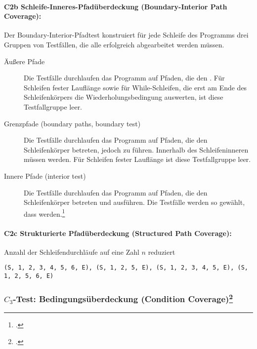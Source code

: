 \documentclass{lehramt-informatik-haupt}
\begin{document}
%

\paragraph{C2b Schleife-Inneres-Pfadüberdeckung (Boundary-Interior Path Coverage):}

\noindent
Der Boundary-Interior-Pfadtest konstruiert für jede Schleife des
Programms drei Gruppen von Testfällen, die alle erfolgreich abgearbeitet
werden müssen.

\begin{description}
\item[Äußere Pfade]
Die Testfälle durchlaufen das Programm auf Pfaden, die den
. Für Schleifen fester Lauflänge
sowie für While-Schleifen, die erst am Ende des Schleifenkörpers die
Wiederholungsbedingung auswerten, ist diese Testfallgruppe leer.

\item[Grenzpfade (boundary paths, boundary test)] Die Testfälle
durchlaufen das Programm auf Pfaden, die den Schleifenkörper betreten,
jedoch zu  führen. Innerhalb des
Schleifeninneren müssen  werden.
Für Schleifen fester Lauflänge ist diese Testfallgruppe leer.

\item[Innere Pfade (interior test)] Die Testfälle durchlaufen das
Programm auf Pfaden, die den Schleifenkörper betreten und
 ausführen. Die Testfälle
werden so gewählt, dass  werden.\footcite[Seite 212]{hoffmann:software}
\end{description}

%

\paragraph{C2c Strukturierte Pfadüberdeckung (Structured Path Coverage):}

\noindent
Anzahl der Schleifendurchläufe auf eine
Zahl $n$ reduziert


\texttt{(S, 1, 2, 3, 4, 5, 6, E), (S, 1, 2, 5, E),
(S, 1, 2, 3, 4, 5, E), (S, 1, 2, 5, 6, E)}

%

\subsubsection{$C_3$-Test: Bedingungsüberdeckung (Condition Coverage)\footcite[Seite 40]{sosy:fs:5}}
\end{document}
